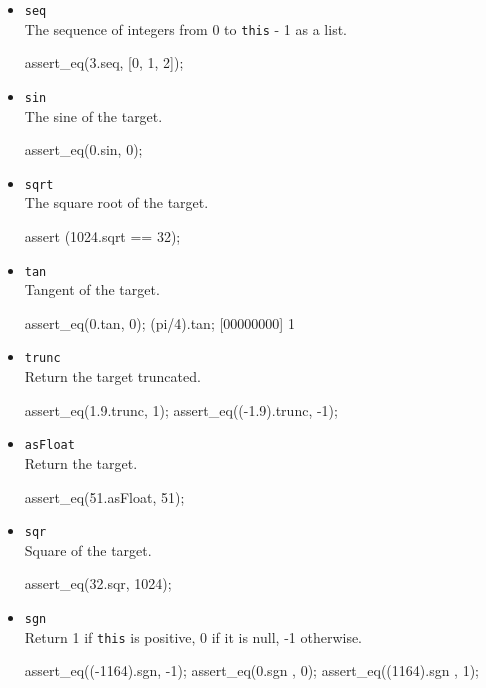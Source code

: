 \begin{itemize}
\item \lstinline|seq|\\
  The sequence of integers from 0 to \lstinline|this| - 1 as a list.
\begin{urbiscript}[firstnumber=last]
assert_eq(3.seq, [0, 1, 2]);
\end{urbiscript}

\item \lstinline|sin|\\
  The sine of the target.
\begin{urbiscript}[firstnumber=last]
assert_eq(0.sin, 0);
\end{urbiscript}

\item \lstinline|sqrt|\\
  The square root of the target.
\begin{urbiscript}[firstnumber=last]
assert (1024.sqrt == 32);
\end{urbiscript}

\item \lstinline|tan|\\
  Tangent of the target.
\begin{urbiscript}[firstnumber=last]
assert_eq(0.tan, 0);
(pi/4).tan;
[00000000] 1
\end{urbiscript}

\item \lstinline|trunc|\\
  Return the target truncated.
\begin{urbiscript}[firstnumber=last]
assert_eq(1.9.trunc, 1);
assert_eq((-1.9).trunc, -1);
\end{urbiscript}

\item \lstinline|asFloat|\\
  Return the target.
\begin{urbiscript}[firstnumber=last]
assert_eq(51.asFloat, 51);
\end{urbiscript}

\item \lstinline|sqr|\\
  Square of the target.
\begin{urbiscript}[firstnumber=last]
assert_eq(32.sqr, 1024);
\end{urbiscript}

\item \lstinline|sgn|\\
  Return 1 if \lstinline|this| is positive, 0 if it is null, -1
  otherwise.
\begin{urbiscript}[firstnumber=last]
assert_eq((-1164).sgn, -1);
assert_eq(0.sgn      , 0);
assert_eq((1164).sgn , 1);
\end{urbiscript}


\end{itemize}
